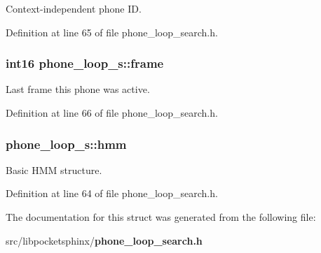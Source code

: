 Context-\/independent phone I\-D. 



Definition at line 65 of file phone\-\_\-loop\-\_\-search.\-h.

\subsubsection[{frame}]{\setlength{\rightskip}{0pt plus 5cm}int16 phone\-\_\-loop\-\_\-s\-::frame}\label{structphone__loop__s_abd028e1ca731cc00d0b8bdf090289242}


Last frame this phone was active. 



Definition at line 66 of file phone\-\_\-loop\-\_\-search.\-h.

\subsubsection[{hmm}]{ phone\-\_\-loop\-\_\-s\-::hmm}\label{structphone__loop__s_ad5812b40537df9b570dfc78f5352d112}


Basic H\-M\-M structure. 



Definition at line 64 of file phone\-\_\-loop\-\_\-search.\-h.



The documentation for this struct was generated from the following file\-:\begin{DoxyCompactItemize}
\item 
src/libpocketsphinx/{\bf phone\-\_\-loop\-\_\-search.\-h}\end{DoxyCompactItemize}
